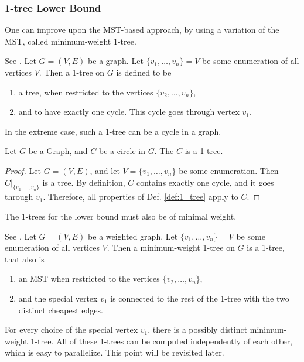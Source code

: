 \subsubsection{1-tree Lower Bound}
\label{sec:1-tree}

One can improve upon the \ac{MST}-based approach,
by using a variation of the \ac{MST}, called minimum-weight 1-tree.

\begin{definition}[1-tree]
  See \cite[p. 1139]{held_traveling-salesman_1970}.
  Let $G=(V,E)$ be a graph.
  Let $\{v_1,\dots,v_n\} = V$ be some enumeration of all vertices $V$.
  Then a 1-tree on $G$ is defined to be
  \begin{enumerate}
    \item a tree, when restricted to the vertices $\{v_2,\dots,v_n\}$,
    \item and to have exactly one cycle. This cycle goes through vertex $v_1$.
  \end{enumerate}
  \label{def:1_tree}
\end{definition}

In the extreme case, such a 1-tree can be a cycle in a graph.

\begin{theorem}
  Let $G$ be a Graph, and $C$ be a circle in $G$.
  The $C$ is a 1-tree.
  \label{thm:cycle_is_1_tree}
\end{theorem}
\begin{proof}
  Let $G = (V,E)$, and let $V = \{v_1, \dots, v_n\}$ be some enumeration.
    Then $C|_{\{v_2,\dots,v_n\}}$ is a tree. By definition, $C$ contains exactly one cycle,
    and it goes through $v_1$. Therefore, all properties of Def. \ref{def:1_tree} apply to $C$.
\end{proof}

The 1-trees for the lower bound must also be of minimal weight.

\begin{definition}
  See \cite[p. 1139]{held_traveling-salesman_1970}.
  Let $G=(V,E)$ be a weighted graph.
  Let $\{v_1,\dots,v_n\} = V$ be some enumeration of all vertices $V$.
  Then a minimum-weight 1-tree on $G$ is a 1-tree, that also is
  \begin{enumerate}
    \item an \ac{MST} when restricted to the vertices $\{v_2,\dots,v_n\}$,
    \item and the special vertex $v_1$ is connected to the rest of the 1-tree with
      the two distinct cheapest edges.
  \end{enumerate}
  \label{def:min_weight_1_tree}
\end{definition}
\begin{remark}
  For every choice of the special vertex $v_1$, there is a possibly distinct minimum-weight 1-tree.
  All of these 1-trees can be computed independently of each other, which is easy to parallelize.
  This point will be revisited later.
\end{remark}


